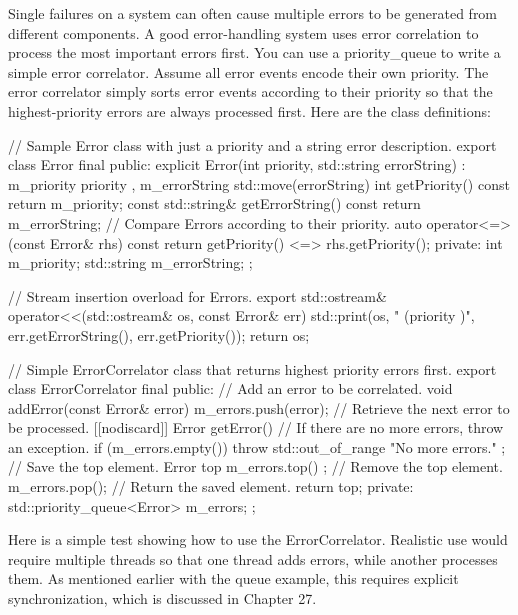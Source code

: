 Single failures on a system can often cause multiple errors to be generated from different components. A good error-handling system uses error correlation to process the most important errors first. You can use a priority\_queue to write a simple error correlator. Assume all error events encode their own priority. The error correlator simply sorts error events according to their priority so that the highest-priority errors are always processed first. Here are the class definitions:

\begin{cpp}
// Sample Error class with just a priority and a string error description.
export class Error final
{
    public:
        explicit Error(int priority, std::string errorString)
            : m_priority { priority }, m_errorString { std::move(errorString) } { }
        int getPriority() const { return m_priority; }
        const std::string& getErrorString() const { return m_errorString; }
        // Compare Errors according to their priority.
        auto operator<=>(const Error& rhs) const {
            return getPriority() <=> rhs.getPriority(); }
    private:
        int m_priority;
        std::string m_errorString;
};

// Stream insertion overload for Errors.
export std::ostream& operator<<(std::ostream& os, const Error& err)
{
    std::print(os, "{} (priority {})", err.getErrorString(), err.getPriority());
    return os;
}

// Simple ErrorCorrelator class that returns highest priority errors first.
export class ErrorCorrelator final
{
    public:
        // Add an error to be correlated.
        void addError(const Error& error) { m_errors.push(error); }
        // Retrieve the next error to be processed.
        [[nodiscard]] Error getError()
        {
            // If there are no more errors, throw an exception.
            if (m_errors.empty()) {
                throw std::out_of_range { "No more errors." };
            }
            // Save the top element.
            Error top { m_errors.top() };
            // Remove the top element.
            m_errors.pop();
            // Return the saved element.
            return top;
        }
    private:
        std::priority_queue<Error> m_errors;
};
\end{cpp}

Here is a simple test showing how to use the ErrorCorrelator. Realistic use would require multiple threads so that one thread adds errors, while another processes them. As mentioned earlier with the queue example, this requires explicit synchronization, which is discussed in Chapter 27.

